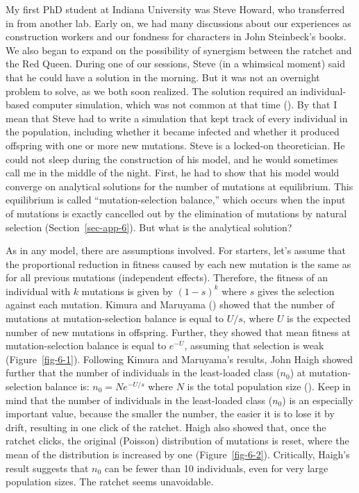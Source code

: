 \documentclass[
  american,
  letterpaper,
]{book}
\begin{document}
My first PhD student at Indiana University was Steve Howard, who
transferred in from another lab. Early on, we had many discussions about
our experiences as construction workers and our fondness for characters
in John Steinbeck's books. We also began to expand on the possibility of
synergism between the ratchet and the Red Queen. During one of our
sessions, Steve (in a whimsical moment) said that he could have a
solution in the morning. But it was not an overnight problem to solve,
as we both soon realized. The solution required an individual-based
computer simulation, which was not common at that time
(). By that I mean that Steve had
to write a simulation that kept track of every individual in the
population, including whether it became infected and whether it produced
offspring with one or more new mutations. Steve is a locked-on
theoretician. He could not sleep during the construction of his model,
and he would sometimes call me in the middle of the night. First, he had
to show that his model would converge on analytical solutions for the
number of mutations at equilibrium. This equilibrium is called
``mutation-selection balance,'' which occurs when the input of mutations
is exactly cancelled out by the elimination of mutations by natural
selection (Section~\ref{sec-app-6}). But what is the analytical
solution?

As in any model, there are assumptions involved. For starters, let's
assume that the proportional reduction in fitness caused by each new
mutation is the same as for all previous mutations (independent
effects). Therefore, the fitness of an individual with \(k\) mutations
is given by \((1-s)^k\) where \(s\) gives the selection against each
mutation. Kimura and Maruyama () showed
that the number of mutations at mutation-selection balance is equal to
\(U/s\), where \(U\) is the expected number of new mutations in
offspring. Further, they showed that mean fitness at mutation-selection
balance is equal to \(e^{-U}\), assuming that selection is weak
(Figure~\ref{fig-6-1}). Following Kimura and Maruyama's results, John
Haigh showed further that the number of individuals in the least-loaded
class (\(n_0\)) at mutation-selection balance is: \(n_0=Ne^{-U/s}\)
where \(N\) is the total population size
(). Keep in mind that the number of
individuals in the least-loaded class (\(n_0\)) is an especially
important value, because the smaller the number, the easier it is to
lose it by drift, resulting in one click of the ratchet. Haigh also
showed that, once the ratchet clicks, the original (Poisson)
distribution of mutations is reset, where the mean of the distribution
is increased by one (Figure~\ref{fig-6-2}). Critically, Haigh's result
suggests that \(n_0\) can be fewer than 10 individuals, even for very
large population sizes. The ratchet seems unavoidable.
\end{document}
